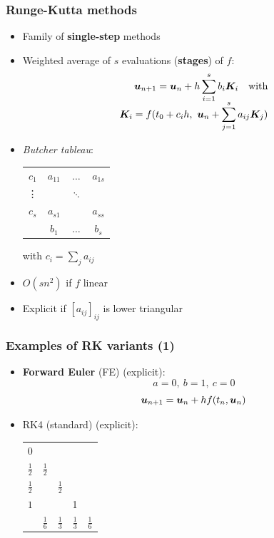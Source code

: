 \documentclass{beamer}
\begin{document}
\begin{frame} %
	\frametitle{Runge-Kutta methods}
	\begin{itemize}
		\item Family of \textbf{single-step} methods
		\item Weighted average of $s$ evaluations (\textbf{stages}) of $f$: \\[-20pt]
		\begin{align*}
			\boldsymbol u_{n+1} = \boldsymbol u_{n} + h \sum_{i=1}^s b_i \boldsymbol K_i \quad \text{with} \\[-5pt]
			\boldsymbol K_i = f(t_0 + c_i h, \ \boldsymbol u_n + \sum_{j=1}^s a_{ij} \boldsymbol K_j)
		\end{align*}
		\pause
		\vspace{-20pt}
		\item \textit{Butcher tableau}:
		\begin{center}
			\begin{tabular}{c|ccc}
				$c_1$ & $a_{11}$ & $\dots$ & $a_{1s}$ \\
				\vdots & & $\ddots$ & \\
				$c_s$ & $a_{s1}$ & & $a_{ss}$ \\
				\hline
				& $b_1$ & $\dots$ & $b_s$
			\end{tabular}
		\hspace{30pt} with $c_i = \sum_j a_{ij}$
		\pause
		\end{center}
		\item $O(s n^2)$ if $f$ linear
		\item Explicit if $[a_{ij}]_{ij}$ is lower triangular
	\end{itemize}
\end{frame}


\begin{frame} %
	\frametitle{Examples of RK variants (1)}
	\begin{itemize}
		\item \textbf{Forward Euler} (FE) (explicit):
		$$ a = 0, \ b = 1, \ c = 0 $$
		$$ \boldsymbol u_{n+1} = \boldsymbol u_{n} + h f(t_n, \boldsymbol u_n) $$
		\item RK4 (standard) (explicit): \\
		\begin{center}
			\begin{tabular}{c|cccc}
				$0$ & & & & \\
				$\frac 1 2$ & $\frac 1 2$ & & & \\
				$\frac 1 2$ & & $\frac 1 2$ & & \\
				$1$ & & & 1 & \\
				\hline
				& $\frac 1 6$ & $\frac 1 3$ & $\frac 1 3$ & $\frac 1 6$
				\end{tabular}
		\end{center}	
	\end{itemize}
\end{frame}
\end{document}
